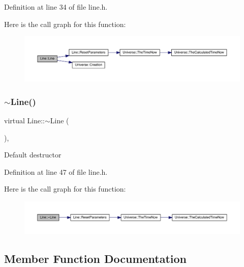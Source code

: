 Definition at line 34 of file line.\+h.

Here is the call graph for this function\+:
\nopagebreak
\begin{figure}[H]
\begin{center}
\leavevmode
\includegraphics[width=350pt]{class_line_a740aacdf468a1519f9a01d9cbd1f9219_cgraph}
\end{center}
\end{figure}
\mbox{\label{class_line_a4a95bafcefa28672b3999deb011b9e50}} 
\subsubsection{\texorpdfstring{$\sim$\+Line()}{~Line()}}
{\footnotesize\ttfamily virtual Line\+::$\sim$\+Line (\begin{DoxyParamCaption}{ }\end{DoxyParamCaption})\hspace{0.3cm}{\ttfamily [inline]}, {\ttfamily [virtual]}}

Default destructor 

Definition at line 47 of file line.\+h.

Here is the call graph for this function\+:\nopagebreak
\begin{figure}[H]
\begin{center}
\leavevmode
\includegraphics[width=350pt]{class_line_a4a95bafcefa28672b3999deb011b9e50_cgraph}
\end{center}
\end{figure}


\subsection{Member Function Documentation}
\mbox{\label{class_line_a4c9d571599ebc5e9b6090b54a338fbde}} 
